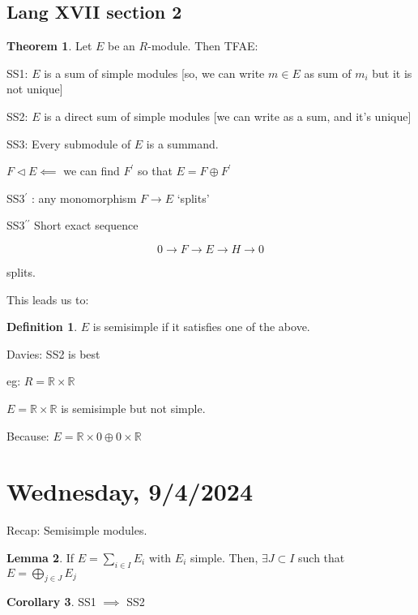 \documentclass{article}
\theoremstyle{definition}
\newtheorem*{definition}{Definition}
\newtheorem{theorem}{Theorem}
\newtheorem{lemma}[theorem]{Lemma}
\newtheorem{corollary}[theorem]{Corollary}
\begin{document}
\subsection*{Lang XVII section 2}

\begin{theorem}
    Let \(E\) be an \(R\)-module. Then TFAE:

    SS1: \(E\) is a sum of simple modules [so, we can write \(m\in E\) as sum of \(m_i\) but it is not unique]

    SS2: \(E\) is a direct sum of simple modules [we can write as a sum, and it's unique]

    SS3: Every submodule of \(E\) is a summand.

    \(F \triangleleft E \impliedby \) we can find \(F^{\prime}\) so that \(E = F \oplus F^{\prime}\) 

    SS3\(^{\prime} \)  : any monomorphism \(F \to E\) `splits'

    SS3\(^{\prime\prime} \) Short exact sequence

    \[
        0 \to F \to E \to H \to 0
    \]

    splits.

\end{theorem}

This leads us to:

\begin{definition}
    \(E\) is semisimple if it satisfies one of the above.
\end{definition}

Davies: SS2 is best

eg: \(R = \mathbb{R} \times \mathbb{R} \) 

\(E = \mathbb{R} \times \mathbb{R}\) is semisimple but not simple.

Because: \(E = \mathbb{R} \times 0 \oplus 0 \times \mathbb{R}\) 


\section*{Wednesday, 9/4/2024}

Recap: Semisimple modules.

\begin{lemma}
    If \(E = \sum_{i\in I} E_i\) with \(E_i\) simple. Then, \(\exists J \subset I\) such that \(E = \bigoplus_{j\in J} E_j\)
\end{lemma}

\begin{corollary}
    SS1 \(\implies\) SS2
\end{corollary}
\end{document}
